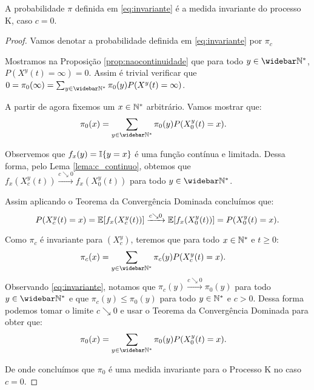 \begin{proposicao}
  A probabilidade $\pi$ definida em \eqref{eq:invariante} é a medida
  invariante do processo K, caso $c = 0$.
\end{proposicao}
\begin{proof}

  Vamos denotar a probabilidade definida em \eqref{eq:invariante} por
  $\pi_c$

  Mostramos na Proposição \ref{prop:naocontinuidade} que para todo $y
  \in \Nzb$, $P(X^y(t) = \infty) = 0$. Assim é trivial verificar que
  $0 = \pi_0(\infty) = \sum_{y\in\Nzb} \pi_0(y) P(X^y(t) =
  \infty)$.

  A partir de agora fixemos um $x \in {\mathbb{N^*}}$ arbitrário. Vamos mostrar que:
  \begin{align*}
    \pi_0(x) &= \sum_{y \in \Nzb} \pi_0 (y) P(X^y_0 (t) = x).
  \end{align*}

  Observemos que $f_x(y) = {\mathbb{I}}\{y = x\}$ é uma função contínua e
  limitada. Dessa forma, pelo Lema \ref{lema:c_continuo}, obtemos que
  $f_x(X^y_c(t)) \xrightarrow{c\searrow 0} f_x(X^y_0(t))$ \qc para
  todo $y\in\Nzb$.


  Assim aplicando o Teorema da Convergência Dominada concluímos que:
  \begin{displaymath}
    P(X^y_c (t) = x) = {\mathbb{E}} [f_x(X^y_c(t))]
    \xrightarrow{c\searrow0}
    {\mathbb{E}} [f_x(X^y_0(t))] = P(X^y_0(t) = x).
  \end{displaymath}

  Como $\pi_c$ é invariante para $(X^y_c)$, teremos que para todo $x
  \in {\mathbb{N^*}}$ e $t \geq 0$:
  \begin{align*}
    \pi_c(x) &= \sum_{y \in \Nzb} \pi_c (y) P(X^y_c (t) = x).
  \end{align*}
  Observando \eqref{eq:invariante}, notamos que $\pi_c(y)
  \xrightarrow{c\searrow 0} \pi_0(y)$ para todo $y \in \Nzb$ e que
  $\pi_c(y) \leq \pi_0(y)$ para todo $y \in {\mathbb{N^*}}$ e $c > 0$.  Dessa
  forma podemos tomar o limite $c\searrow0$ e usar o Teorema da
  Convergência Dominada para obter que:
  \begin{align*}
    \pi_0(x) &= \sum_{y \in \Nzb} \pi_0 (y) P(X^y_0 (t) = x).
  \end{align*}

  De onde concluímos que $\pi_0$ é uma medida invariante para o
  Processo K no caso $c = 0$.
\end{proof}



